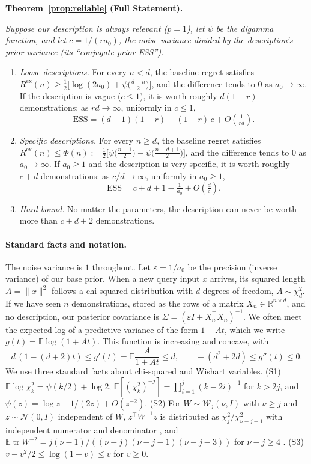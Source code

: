 \documentclass{article}
\newcommand{\ess}{\mathrm{ESS}}
\newcommand{\E}{\mathbb{E}}
\newcommand{\R}{\mathbb{R}}
\begin{document}
\medskip\noindent\textbf{Theorem~\ref{prop:reliable} (Full Statement).} {\itshape Suppose our description is always relevant ($p = 1$), let $\psi$ be the digamma function, and let $c = 1/(r a_0)$, the noise variance divided by the description's prior variance (its ``conjugate-prior ESS'').
\begin{enumerate}
\item[(i)] \emph{Loose descriptions.} For every $n < d$, the baseline regret satisfies $R^{\mathrm{ex}}(n) \ge \tfrac12\big[\log(2a_0) + \psi\big(\tfrac{d-n}{2}\big)\big]$, and the difference tends to $0$ as $a_0 \to \infty$. If the description is vague ($c \le 1$), it is worth roughly $d(1-r)$ demonstrations: as $rd \to \infty$, uniformly in $c \le 1$,
\[
\ess = (d-1)(1-r) + (1-r)\,c + O\!\left(\tfrac{1}{rd}\right).
\]
\item[(ii)] \emph{Specific descriptions.} For every $n \ge d$, the baseline regret satisfies $R^{\mathrm{ex}}(n) \le \Phi(n) := \tfrac12\big[\psi\big(\tfrac{n+1}{2}\big) - \psi\big(\tfrac{n-d+1}{2}\big)\big]$, and the difference tends to $0$ as $a_0 \to \infty$. If $a_0 \ge 1$ and the description is very specific, it is worth roughly $c + d$ demonstrations: as $c/d \to \infty$, uniformly in $a_0 \ge 1$,
\[
\ess = c + d + 1 - \tfrac{1}{a_0} + O\!\left(\tfrac{d}{c}\right).
\]
\item[(iii)] \emph{Hard bound.} No matter the parameters, the description can never be worth more than $c + d + 2$ demonstrations.
\end{enumerate}}
\medskip

\paragraph{Standard facts and notation.}
The noise variance is $1$ throughout. Let $\varepsilon = 1/a_0$ be the precision (inverse variance) of our base prior. When a new query input $x$ arrives, its squared length $A = \|x\|^2$ follows a chi-squared distribution with $d$ degrees of freedom, $A \sim \chi^2_d$. If we have seen $n$ demonstrations, stored as the rows of a matrix $X_n \in \R^{n \times d}$, and no description, our posterior covariance is $\Sigma = (\varepsilon I + X_n^\top X_n)^{-1}$. We often meet the expected log of a predictive variance of the form $1 + At$, which we write $g(t) = \E \log(1 + At)$. This function is increasing and concave, with
\begin{equation}\label{eq:g-derivs}
d\,(1 - (d+2)t) \le g'(t) = \E \frac{A}{1 + At} \le d,
\qquad
-(d^2 + 2d) \le g''(t) \le 0 .
\end{equation}
We use three standard facts about chi-squared and Wishart variables. (S1) $\E \log \chi^2_k = \psi(k/2) + \log 2$, $\E[(\chi^2_k)^{-j}] = \prod_{i=1}^{j} (k - 2i)^{-1}$ for $k > 2j$, and $\psi(z) = \log z - 1/(2z) + O(z^{-2})$. (S2) For $W \sim \mathcal{W}_j(\nu, I)$ with $\nu \ge j$ and $z \sim \mathcal{N}(0, I)$ independent of $W$, $z^\top W^{-1} z$ is distributed as $\chi^2_j / \chi^2_{\nu-j+1}$ with independent numerator and denominator \citep[Theorem~3.2.12]{muirhead1982}, and $\E \operatorname{tr} W^{-2} = j(\nu-1)/((\nu-j)(\nu-j-1)(\nu-j-3))$ for $\nu - j \ge 4$ \citep{vonrosen1988}. (S3) $v - v^2/2 \le \log(1 + v) \le v$ for $v \ge 0$.
\end{document}
